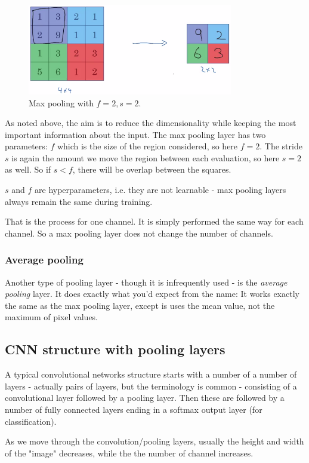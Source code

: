 \documentclass[12pt, a4paper]{article}
\numberwithin{equation}{section}
\begin{document}
\begin{figure}
\centering
\includegraphics[width=0.8\textwidth]{max_pooling}
\caption{Max pooling with $f=2, s=2$.}
\label{fig:max_pooling}
\end{figure}

As noted above, the aim is to reduce the dimensionality while keeping the most important information about the input. The max pooling layer has two parameters: $f$ which is the size of the region considered, so here $f=2$. The stride $s$ is again the amount we move the region between each evaluation, so here $s=2$ as well. So if $s<f$, there will be overlap between the squares.

$s$ and $f$ are hyperparameters, i.e. they are not learnable - max pooling layers always remain the same during training.

That is the process for one channel. It is simply performed the same way for each channel. So a max pooling layer does not change the number of channels.

\subsubsection{Average pooling}
Another type of pooling layer - though it is infrequently used - is the \textit{average pooling} layer. It does exactly what you'd expect from the name: It works exactly the same as the max pooling layer, except is uses the mean value, not the maximum of pixel values.

\subsection{CNN structure with pooling layers}
A typical convolutional networks structure starts with a number of a number of layers - actually pairs of layers, but the terminology is common - consisting of a convolutional layer followed by a pooling layer. Then these are followed by a number of fully connected layers ending in a softmax output layer (for classification).

As we move through the convolution/pooling layers, usually the height and width of the "image" decreases, while the the number of channel increases.
\end{document}
